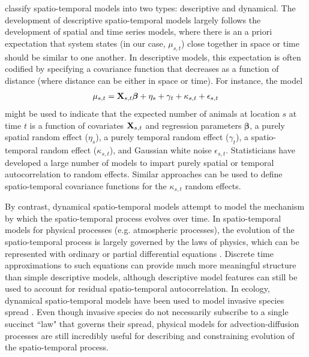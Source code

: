 \documentclass[times,mee,doublespace,]{besauth2}
\begin{document}
\citet{CressieWikle2011} classify spatio-temporal models into two types: descriptive and dynamical.  The development of descriptive spatio-temporal models largely follows the development of spatial and time series models, where there is an a priori expectation that system states (in our case, $\mu_{s,t}$) close together in space or time should be similar to one another.  In descriptive models, this expectation is often codified by specifying a covariance function that decreases as a function of distance (where distance can be either in space or time).  For instance, the model
\begin{eqnarray}
  \mu_{s,t} = {\bf X}_{s,t} \boldsymbol{\beta} + \eta_s + \gamma_t + \kappa_{s,t} + \epsilon_{s,t} \label{eq:glmm}
\end{eqnarray}
might be used to indicate that the expected number of animals at location $s$ at time $t$ is a function of covariates ${\bf X}_{s,t}$ and regression parameters $\boldsymbol{\beta}$, a purely spatial random effect ($\eta_s$), a purely temporal random effect ($\gamma_t$), a spatio-temporal random effect ($\kappa_{s,t}$), and Gaussian white noise $\epsilon_{s,t}$.  Statisticians have developed a large number of models to impart purely spatial \citep[e.g. geostatistical models, Gaussian Markov random fields (GMRFs); see e.g.][]{Cressie1993,BanerjeeEtAl2004,RueHeld2005} or temporal \citep[e.g. AR(p) processes and ARIMA models;][]{BoxEtAl2008,PradoWest2010} autocorrelation to random effects.
Similar approaches can be used to define spatio-temporal covariance functions \citep{CressieWikle2011} for the $\kappa_{s,t}$ random effects.

By contrast, dynamical spatio-temporal models attempt to model the mechanism by which the spatio-temporal process evolves over time.  In spatio-temporal models for physical processes (e.g. atmospheric processes), the evolution of the spatio-temporal process is largely governed by the laws of physics, which can be represented with ordinary or partial differential equations \citep{WikleEtAl2001,WikleHooten2010}.  Discrete time approximations to such equations can provide much more meaningful structure than simple descriptive models, although descriptive model features can still be used to account for residual spatio-temporal autocorrelation.  In ecology, dynamical spatio-temporal models have been used to model invasive species spread \citep{Wikle2003,HootenEtAl2007,HootenWikle2008}.  Even though invasive species do not necessarily subscribe to a single succinct ``law" that governs their spread, physical models for advection-diffusion processes are still incredibly useful for describing and constraining evolution of the spatio-temporal process.
\end{document}

